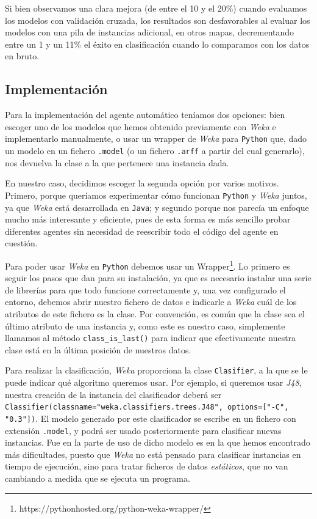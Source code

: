 \documentclass[12pt]{article}
\begin{document}
\vspace{0.3cm}

Si bien observamos una clara mejora (de entre el 10 y el 20\%) cuando evaluamos los modelos con validación cruzada, los resultados son desfavorables al evaluar los modelos con una pila de instancias adicional, en otros mapas, decrementando entre un 1 y un 11\% el éxito en clasificación cuando lo comparamos con los datos en bruto.

\subsection{Implementación}

Para la implementación del agente automático teníamos dos opciones: bien escoger uno de los modelos que hemos obtenido previamente con \emph{Weka} e implementarlo manualmente, o usar un wrapper de \emph{Weka} para \texttt{Python} que, dado un modelo en un fichero \texttt{.model} (o un fichero \texttt{.arff} a partir del cual generarlo), nos devuelva la clase a la que pertenece una instancia dada.

En nuestro caso, decidimos escoger la segunda opción por varios motivos. Primero, porque queríamos experimentar cómo funcionan \texttt{Python} y \emph{Weka} juntos, ya que \emph{Weka} está desarrollada en \texttt{Java}; y segundo porque nos parecía un enfoque mucho más interesante y eficiente, pues de esta forma es más sencillo probar diferentes agentes sin necesidad de reescribir todo el código del agente en cuestión.

Para poder usar \emph{Weka} en \texttt{Python} debemos usar un Wrapper\footnote{https://pythonhosted.org/python-weka-wrapper/}. Lo primero es seguir los pasos que dan para su instalación, ya que es necesario instalar una serie de librerías para que todo funcione correctamente y, una vez configurado el entorno, debemos abrir nuestro fichero de datos e indicarle a \emph{Weka} cuál de los atributos de este fichero es la clase. Por convención, es común que la clase sea el último atributo de una instancia y, como este es nuestro caso, simplemente llamamos al método \texttt{class\_is\_last()} para indicar que efectivamente nuestra clase está en la última posición de nuestros datos.

\newpage

Para realizar la clasificación, \emph{Weka} proporciona la clase \texttt{Clasifier}, a la que se le puede indicar qué algoritmo queremos usar. Por ejemplo, si queremos usar \emph{J48}, nuestra creación de la instancia del clasificador deberá ser \texttt{Classifier(classname="weka.classifiers.trees.J48", options=["-C", "0.3"])}. El modelo generado por este clasificador se escribe en un fichero con extensión \texttt{.model}, y podrá ser usado posteriormente para clasificar nuevas instancias. Fue en la parte de uso de dicho modelo es en la que hemos encontrado más dificultades, puesto que \emph{Weka} no está pensado para clasificar instancias en tiempo de ejecución, sino para tratar ficheros de datos \emph{estáticos}, que no van cambiando a medida que se ejecuta un programa.
\end{document}
